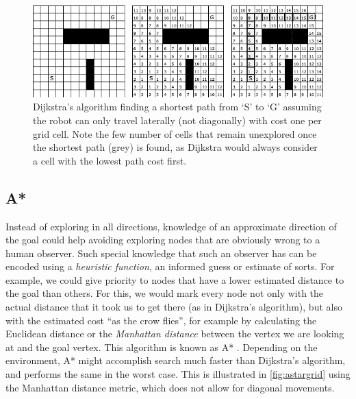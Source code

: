 \begin{figure}[htb]
    \centering
    \includegraphics[width=\textwidth]{figs/dijkstragrid.pdf}
    \caption{Dijkstra's algorithm finding a shortest path from `S' to `G' assuming the robot can only travel laterally (not diagonally) with cost one per grid cell. Note the few number of cells that remain unexplored once the shortest path (grey) is found, as Dijkstra would always consider a cell with the lowest path cost first.\label{fig:dijkstragrid}}
\end{figure}

\subsection{A*}\label{sec:astar}
Instead of exploring in all directions, knowledge of an approximate direction of the goal could help avoiding exploring nodes that are obviously wrong to a human observer. Such special knowledge that such an observer has can be encoded using a \textsl{heuristic function}, an informed guess or estimate of sorts. For example, we could give priority to nodes that have a lower estimated distance to the goal than others. For this, we would mark every node not only with the actual distance that it took us to get there (as in Dijkstra's algorithm), but also with the estimated cost ``as the crow flies'', for example by calculating the Euclidean distance or the \textsl{Manhattan distance} between the vertex we are looking at and the goal vertex. This algorithm is known as A* \cite{hart1968formal}. Depending on the environment, A* might accomplish search much faster than Dijkstra's algorithm, and performs the same in the worst case. This is illustrated in \cref{fig:astargrid} using the Manhattan distance metric, which does not allow for diagonal movements.

